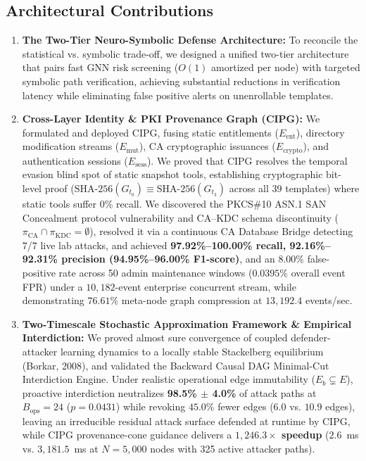 \subsection{Architectural Contributions}
\begin{enumerate}
    \item \textbf{The Two-Tier Neuro-Symbolic Defense Architecture:} To reconcile the statistical vs. symbolic trade-off, we designed a unified two-tier architecture that pairs fast GNN risk screening ($O(1)$ amortized per node) with targeted symbolic path verification, achieving substantial reductions in verification latency while eliminating false positive alerts on unenrollable templates.
    \item \textbf{Cross-Layer Identity \& PKI Provenance Graph (CIPG):} We formulated and deployed CIPG, fusing static entitlements ($E_{\text{ent}}$), directory modification streams ($E_{\text{mut}}$), CA cryptographic issuances ($E_{\text{crypto}}$), and authentication sessions ($E_{\text{sess}}$). We proved that CIPG resolves the temporal evasion blind spot of static snapshot tools, establishing cryptographic bit-level proof ($\text{SHA-256}(G_{t_0}) \equiv \text{SHA-256}(G_{t_3})$ across all 39 templates) where static tools suffer $0\%$ recall. We discovered the PKCS\#10 ASN.1 SAN Concealment protocol vulnerability and CA--KDC schema discontinuity ($\pi_{\text{CA}} \cap \pi_{\text{KDC}} = \emptyset$), resolved it via a continuous CA Database Bridge detecting 7/7 live lab attacks, and achieved \textbf{97.92\%--100.00\% recall, 92.16\%--92.31\% precision (94.95\%--96.00\% F1-score)}, and an $8.00\%$ false-positive rate across 50 admin maintenance windows ($0.0395\%$ overall event FPR) under a $10,182$-event enterprise concurrent stream, while demonstrating $76.61\%$ meta-node graph compression at $13,192.4$ events/sec.
    \item \textbf{Two-Timescale Stochastic Approximation Framework \& Empirical Interdiction:} We proved almost sure convergence of coupled defender-attacker learning dynamics to a locally stable Stackelberg equilibrium (Borkar, 2008), and validated the Backward Causal DAG Minimal-Cut Interdiction Engine. Under realistic operational edge immutability ($E_b \subsetneq E$), proactive interdiction neutralizes \textbf{98.5\% $\pm$ 4.0\%} of attack paths at $B_{\text{ops}}=24$ ($p = 0.0431$) while revoking $45.0\%$ fewer edges ($6.0$ vs. $10.9$ edges), leaving an irreducible residual attack surface defended at runtime by CIPG, while CIPG provenance-cone guidance delivers a \textbf{$1,246.3\times$ speedup} ($2.6$~ms vs. $3,181.5$~ms at $N=5,000$ nodes with 325 active attacker paths).
\end{enumerate}

